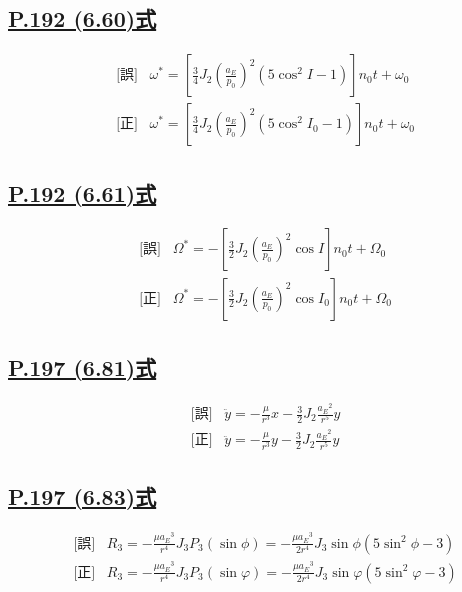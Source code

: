\documentclass[9pt,fleqn]{bxjsarticle}
\begin{document}
\subsection*{\underline{P.192 (6.60)式}}
\begin{align*}
    &\text{[誤]} \hspace{10pt} \omega^* = \left[\frac{3}{4}J_2\left(\frac{a_E}{p_0}\right)^2\left(5\cos^2{I}-1\right)\right]n_0t + \omega_0 \\
    &\text{[正]} \hspace{10pt} \omega^* = \left[\frac{3}{4}J_2\left(\frac{a_E}{p_0}\right)^2\left(5\cos^2{I_0}-1\right)\right]n_0t + \omega_0 
\end{align*}

\subsection*{\underline{P.192 (6.61)式}}
\begin{align*}
    &\text{[誤]} \hspace{10pt} \Omega^* = -\left[\frac{3}{2}J_2\left(\frac{a_E}{p_0}\right)^2\cos{I}\right]n_0t + \Omega_0 \\
    &\text{[正]} \hspace{10pt} \Omega^* = -\left[\frac{3}{2}J_2\left(\frac{a_E}{p_0}\right)^2\cos{I_0}\right]n_0t + \Omega_0 
\end{align*}

\subsection*{\underline{P.197 (6.81)式}}
\begin{align*}
    &\text{[誤]} \hspace{10pt} \ddot{y} = -\frac{\mu}{r^3}x - \frac{3}{2}J_2\frac{{a_E}^2}{r^5}y \\
    &\text{[正]} \hspace{10pt} \ddot{y} = -\frac{\mu}{r^3}y - \frac{3}{2}J_2\frac{{a_E}^2}{r^5}y 
\end{align*}

\subsection*{\underline{P.197 (6.83)式}}
\begin{align*}
    &\text{[誤]} \hspace{10pt} R_3 = -\frac{\mu{a_E}^3}{r^4}J_3P_3\left(\sin{\phi}\right)
    = -\frac{\mu{a_E}^3}{2r^4}J_3\sin{\phi}\left(5\sin^2{\phi}-3\right) \\
    &\text{[正]} \hspace{10pt} R_3 = -\frac{\mu{a_E}^3}{r^4}J_3P_3\left(\sin{\varphi}\right)
    = -\frac{\mu{a_E}^3}{2r^4}J_3\sin{\varphi}\left(5\sin^2{\varphi}-3\right) 
\end{align*}
\end{document}
